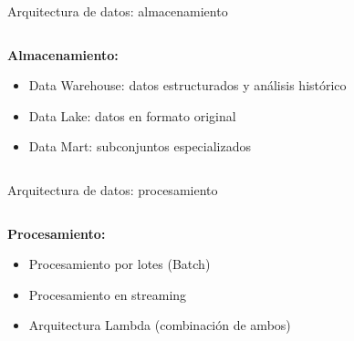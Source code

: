 \documentclass{beamer}
\begin{document}
\begin{frame}{Arquitectura de datos: almacenamiento}
    \begin{columns}
        \begin{column}{0.6\textwidth}
            \textbf{Almacenamiento:}
            \begin{itemize}
                \item Data Warehouse: datos estructurados y análisis histórico
                \item Data Lake: datos en formato original
        \item Data Mart: subconjuntos especializados
            \end{itemize}
        \end{column}
        \begin{column}{0.4\textwidth}
            \centering
            {\fontsize{60}{60}\selectfont \faDatabase}
        \end{column}
    \end{columns}
\end{frame}

\begin{frame}{Arquitectura de datos: procesamiento}
    \begin{columns}
        \begin{column}{0.6\textwidth}
            \textbf{Procesamiento:}
            \begin{itemize}
                \item Procesamiento por lotes (Batch)
        \item Procesamiento en streaming
        \item Arquitectura Lambda (combinación de ambos)
            \end{itemize}
        \end{column}
        \begin{column}{0.4\textwidth}
            \centering
            {\fontsize{60}{60}\selectfont \faCogs}
        \end{column}
    \end{columns}
\end{frame}
\end{document}
